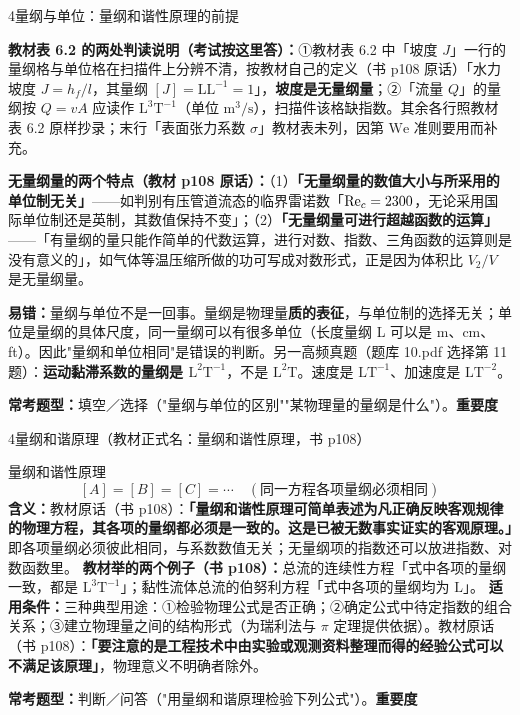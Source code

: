 \begin{kaodian}{4}{量纲与单位：量纲和谐性原理的前提}
\begin{tishi}
\textbf{教材表 6.2 的两处判读说明（考试按这里答）：}①教材表 6.2 中「坡度 $J$」一行的量纲格与单位格在扫描件上分辨不清，按教材自己的定义（书 p108 原话）「水力坡度 $J=h_f/l$，其量纲 $[J]=\mathrm{LL^{-1}}=1$」，\textbf{坡度是无量纲量}；②「流量 $Q$」的量纲按 $Q=vA$ 应读作 $\mathrm{L^{3}T^{-1}}$（单位 $\mathrm{m^{3}/s}$），扫描件该格缺指数。其余各行照教材表 6.2 原样抄录；末行「表面张力系数 $\sigma$」教材表未列，因第 $\mathrm{We}$ 准则要用而补充。
\end{tishi}

\textbf{无量纲量的两个特点（教材 p108 原话）：}（1）\textbf{「无量纲量的数值大小与所采用的单位制无关」}——如判别有压管道流态的临界雷诺数「$\mathrm{Re}_c=2300$，无论采用国际单位制还是英制，其数值保持不变」；（2）\textbf{「无量纲量可进行超越函数的运算」}——「有量纲的量只能作简单的代数运算，进行对数、指数、三角函数的运算则是没有意义的」，如气体等温压缩所做的功可写成对数形式，正是因为体积比 $V_2/V$ 是无量纲量。

\begin{yicuo}
\textbf{易错：}量纲与单位不是一回事。量纲是物理量\textbf{质的表征}，与单位制的选择无关；单位是量纲的具体尺度，同一量纲可以有很多单位（长度量纲 L 可以是 m、cm、ft）。因此"量纲和单位相同"是错误的判断。另一高频真题（题库 10.pdf 选择第 11 题）：\textbf{运动黏滞系数的量纲是 $\mathrm{L^{2}T^{-1}}$}，不是 $\mathrm{L^{2}T}$。速度是 $\mathrm{LT^{-1}}$、加速度是 $\mathrm{LT^{-2}}$。
\end{yicuo}

\textbf{常考题型：}填空／选择（"量纲与单位的区别""某物理量的量纲是什么"）。\quad\textbf{重要度 }\quad{}\quad{}
\end{kaodian}

\begin{kaodian}{4}{量纲和谐原理（教材正式名：量纲和谐性原理，书 p108）}
\begin{gongshi}{量纲和谐性原理}
\[ [A]=[B]=[C]=\cdots \quad(\text{同一方程各项量纲必须相同}) \]
\textbf{含义：}教材原话（书 p108）：\textbf{「量纲和谐性原理可简单表述为凡正确反映客观规律的物理方程，其各项的量纲都必须是一致的。这是已被无数事实证实的客观原理。」}即各项量纲必须彼此相同，与系数数值无关；无量纲项的指数还可以放进指数、对数函数里。
\textbf{教材举的两个例子（书 p108）：}总流的连续性方程「式中各项的量纲一致，都是 $\mathrm{L^{3}T^{-1}}$」；黏性流体总流的伯努利方程「式中各项的量纲均为 $\mathrm{L}$」。
\textbf{适用条件：}三种典型用途：①检验物理公式是否正确；②确定公式中待定指数的组合关系；③建立物理量之间的结构形式（为瑞利法与 $\pi$ 定理提供依据）。教材原话（书 p108）：\textbf{「要注意的是工程技术中由实验或观测资料整理而得的经验公式可以不满足该原理」}，物理意义不明确者除外。
\end{gongshi}

\textbf{常考题型：}判断／问答（"用量纲和谐原理检验下列公式"）。\quad\textbf{重要度 }\quad{}\quad{}
\end{kaodian}

